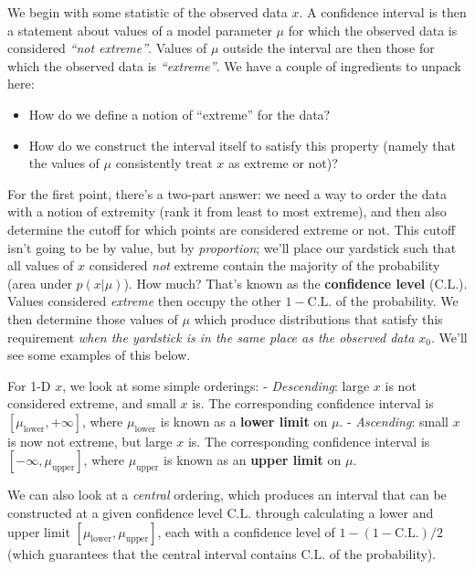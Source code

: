 \documentclass[
  11pt,
  numbers=noendperiod]{book}
\providecommand{\tightlist}{%
  \setlength{\itemsep}{0pt}\setlength{\parskip}{0pt}}\usepackage{longtable,booktabs,array}
\begin{document}
We begin with some statistic of the observed data \(x\). A confidence
interval is then a statement about values of a model parameter \(\mu\)
for which the observed data is considered \emph{``not extreme''}. Values
of \(\mu\) outside the interval are then those for which the observed
data is \emph{``extreme''}. We have a couple of ingredients to unpack
here:

\begin{itemize}
\tightlist
\item
  How do we define a notion of ``extreme'' for the data?
\item
  How do we construct the interval itself to satisfy this property
  (namely that the values of \(\mu\) consistently treat \(x\) as extreme
  or not)?
\end{itemize}

For the first point, there's a two-part answer: we need a way to order
the data with a notion of extremity (rank it from least to most
extreme), and then also determine the cutoff for which points are
considered extreme or not. This cutoff isn't going to be by value, but
by \emph{proportion}; we'll place our yardstick such that all values of
\(x\) considered \emph{not} extreme contain the majority of the
probability (area under \(p(x|\mu)\)). How much? That's known as the
\textbf{confidence level} (\(\mathrm{C.L.}\)). Values considered
\emph{extreme} then occupy the other \(1-\mathrm{C.L.}\) of the
probability. We then determine those values of \(\mu\) which produce
distributions that satisfy this requirement \emph{when the yardstick is
in the same place as the observed data \(x_0\)}. We'll see some examples
of this below.

For 1-D \(x\), we look at some simple orderings: - \emph{Descending}:
large \(x\) is not considered extreme, and small \(x\) is. The
corresponding confidence interval is
\([\mu_{\mathrm{lower}}, +\infty]\), where \(\mu_{\mathrm{lower}}\) is
known as a \textbf{lower limit} on \(\mu\). - \emph{Ascending}: small
\(x\) is now not extreme, but large \(x\) is. The corresponding
confidence interval is \([-\infty, \mu_{\mathrm{upper}}]\), where
\(\mu_{\mathrm{upper}}\) is known as an \textbf{upper limit} on \(\mu\).

We can also look at a \emph{central} ordering, which produces an
interval that can be constructed at a given confidence level
\(\mathrm{C.L.}\) through calculating a lower and upper limit
\([\mu_{\mathrm{lower}}, \mu_{\mathrm{upper}}]\), each with a confidence
level of \(1-(1-\mathrm{C.L.})/2\) (which guarantees that the central
interval contains \(\mathrm{C.L.}\) of the probability).
\end{document}
